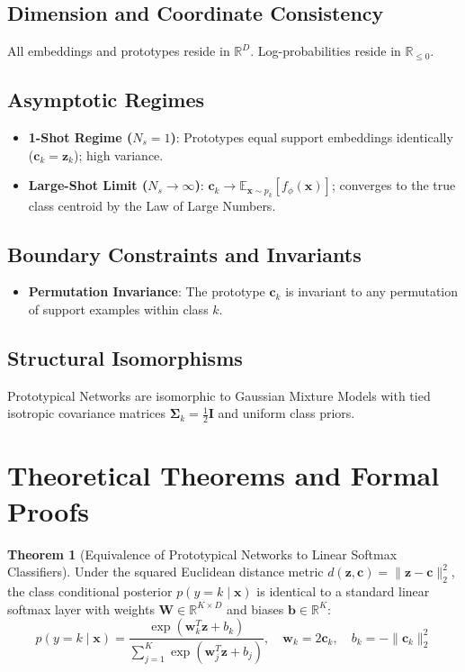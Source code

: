 \documentclass[11pt,a4paper]{article}
\theoremstyle{definition}
\newtheorem{theorem}{\textbf{Theorem}}[section]
\begin{document}
\subsection{Dimension and Coordinate Consistency}
All embeddings and prototypes reside in $\mathbb{R}^D$. Log-probabilities reside in $\mathbb{R}_{\le 0}$.

\subsection{Asymptotic Regimes}
\begin{itemize}
    \item \textbf{1-Shot Regime ($N_s = 1$)}: Prototypes equal support embeddings identically ($\mathbf{c}_k = \mathbf{z}_k$); high variance.
    \item \textbf{Large-Shot Limit ($N_s \to \infty$)}: $\mathbf{c}_k \to \mathbb{E}_{\mathbf{x} \sim p_k}[f_\phi(\mathbf{x})]$; converges to the true class centroid by the Law of Large Numbers.
\end{itemize}

\subsection{Boundary Constraints and Invariants}
\begin{itemize}
    \item \textbf{Permutation Invariance}: The prototype $\mathbf{c}_k$ is invariant to any permutation of support examples within class $k$.
\end{itemize}

\subsection{Structural Isomorphisms}
Prototypical Networks are isomorphic to Gaussian Mixture Models with tied isotropic covariance matrices $\boldsymbol{\Sigma}_k = \frac{1}{2}\mathbf{I}$ and uniform class priors.

\section{Theoretical Theorems and Formal Proofs}

\begin{theorem}[Equivalence of Prototypical Networks to Linear Softmax Classifiers]
Under the squared Euclidean distance metric $d(\mathbf{z}, \mathbf{c}) = \|\mathbf{z} - \mathbf{c}\|_2^2$, the class conditional posterior $p(y = k \mid \mathbf{x})$ is identical to a standard linear softmax layer with weights $\mathbf{W} \in \mathbb{R}^{K \times D}$ and biases $\mathbf{b} \in \mathbb{R}^K$:
{\boldmath
\begin{equation}
p(y = k \mid \mathbf{x}) = \frac{\exp(\mathbf{w}_k^T \mathbf{z} + b_k)}{\sum_{j=1}^K \exp(\mathbf{w}_j^T \mathbf{z} + b_j)}, \quad \mathbf{w}_k = 2\mathbf{c}_k, \quad b_k = -\|\mathbf{c}_k\|_2^2
\end{equation}
}
\end{theorem}
\end{document}
